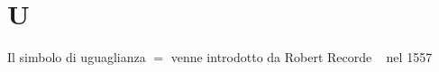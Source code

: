 \chapter{U}
\vspace{5mm} 
 Il simbolo di uguaglianza $=$ venne introdotto da Robert  Recorde \pointsto~ nel 1557\cite{Kline1972}